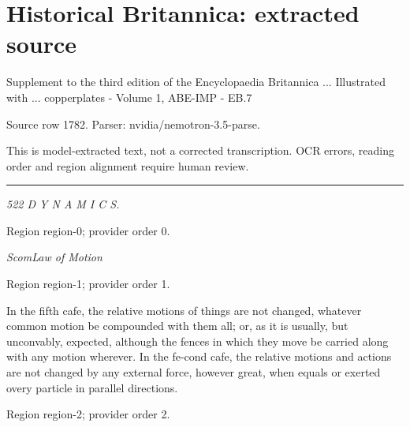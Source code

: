 \documentclass[11pt]{article}
\begin{document}
\section*{Historical Britannica: extracted source}
Supplement to the third edition of the Encyclopaedia Britannica ... Illustrated with ... copperplates - Volume 1, ABE-IMP - EB.7\par
{\small Source row 1782. Parser: nvidia/nemotron-3.5-parse.\par}
{\small This is model-extracted text, not a corrected transcription. OCR errors, reading order and region alignment require human review.\par}
\hrule\medskip
{\small\itshape 522 D Y N A M I C S.\par}

{\scriptsize\color{gray} Region region-0; provider order 0.\par}
\medskip

{\small\itshape ScomLaw of Motion\par}

{\scriptsize\color{gray} Region region-1; provider order 1.\par}
\medskip

In the fifth cafe, the relative motions of things are not changed, whatever common motion be compounded with them all; or, as it is usually, but unconvably, expected, although the fences in which they move be carried along with any motion wherever. In the fe-cond cafe, the relative motions and actions are not changed by any external force, however great, when equals or exerted overy particle in parallel directions.
\par

{\scriptsize\color{gray} Region region-2; provider order 2.\par}
\medskip
\end{document}

